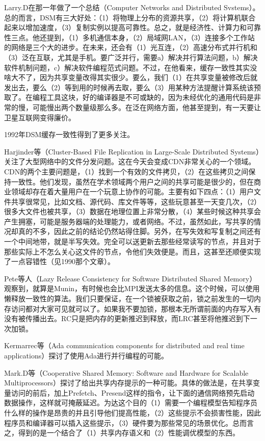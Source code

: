 \documentclass[a4paper,twoside]{scrbook}
\begin{document}
Larry.D在那一年做了一个总结（Computer Networks and Distributed Svstems）。总的而言，DSM有三大好处：（1）将物理上分布的资源共享，（2）将计算机联合起来以增加速度，（3）复制实例以提高可靠性。总之，就是经济性、计算力和可靠性三点。他还提到，（1）多机通信本身，（2）局域网LAN，（3）连接多个工作站的网络是三个大的进步。在未来，还会有（1）光互连，（2）高速分布式并行机和（3）泛在互联，尤其是手机。要广泛并行，需要a）解决并行算法问题，b）解决软件机制问题，c）解决软件编程范式问题。不过，在他看来，缓存一致性其实没啥大不了，因为共享变量改得其实很少。要么，我们（1）在共享变量被修改后就发出去，要么（2）等到用的时候再去取，要么（3）用某种方法提醒计算系统该预取了。在编程工具这块，好的编译器是不可或缺的，因为未经优化的通用代码是非常的慢，可能慢出两个数量级那么多。在泛在网络方面，他甚至提到，有一天要让卫星互联网变得廉价。


1992年DSM缓存一致性得到了更多关注。

Harjinder等（Cluster-Based File Replication in Large-Scale Distributed Systems）关注了大型网络中的文件分发问题。这在今天会变成CDN非常关心的一个领域。CDN的两个主要问题是，（1）找到一个有效的文件拷贝，（2）在这些拷贝之间保持一致性。他们发现，虽然在学术领域两个用户之间的共享可能是很少的，但在商业领域却存在着大量用户在一个玩意上协作的可能。主要有如下四点：（1）用户文件共享很常见，比如文档、源代码、库文件等等，这些玩意甚至一天变几次，（2）很多大文件也被共享，（3）数据在地理位置上非常分散，（4）某些时候这种共享会产生拥塞，可能是服务器端的处理能力，或者网络。不过，虽然如此，写共享的情况却真的不多，因此之前的结论仍然站得住脚。另外，在写失效和写复制之间还有一个中间地带，就是半写失效。完全可以送更新去那些经常读写的节点，并且对于那些实际上不怎么关心这文件的节点，令他们失效便是。而且，这甚至还顺便实现了一点容错性（见1990那个文章）。

Pete等人（Lazy Release Consistency for Software Distributed Shared Memory）观察到，就算是Munin，有时候也会比MPI发送太多的信息。这个时候，可以使用懒释放一致性的算法。我们只要保证，在一个锁被获取之前，锁之前发生的一切内存访问都对大家可见就可以了。如果我不要加锁，那根本无所谓前面的内存写入有没有被传播出去。RC只是把内存的更新推迟到释放，而LRC甚至将他推迟到下一次加锁。

Kermarrec等（Ada communication components for distributed and real time applications）探讨了使用Ada进行并行编程的可能。

Mark.D等（Cooperative Shared Memory: Software and Hardware for Scalable Multiprocessors）探讨了给出共享内存提示的一种可能。具体的做法是，在共享变量访问的前后，加上Prefetch、Presend这样的指令，让下面的通信网络预先启动数据操作，这样就可掩蔽延迟。为达这个目的（1）需要一个编程模型告知程序员什么样的操作是昂贵的并且引导他们提高性能，（2）这些提示不会损害性能，因此程序员和编译器可以插入这些提示，（3）硬件要为那些常见的场景优化。总而言之，得到的是一个结合了（1）共享内存语义和（2）性能调优模型的东西。
\end{document}
